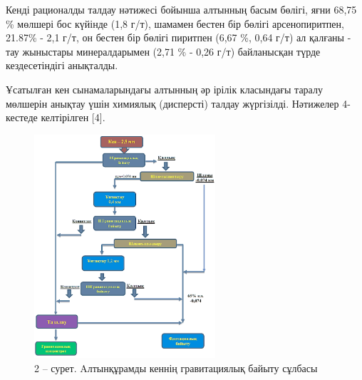 \begin{multicols}{2}

Кенді рационалды талдау нәтижесі бойынша алтынның басым бөлігі, яғни
68,75 \% мөлшері бос күйінде (1,8 г/т), шамамен бестен бір бөлігі
арсенопиритпен, 21.87\% - 2,1 г/т, он бестен бір бөлігі пиритпен (6,67
\%, 0,64 г/т) ал қалғаны - тау жыныстары минералдарымен (2,71 \% - 0,26
г/т) байланысқан түрде кездесетіндігі анықталды.

Ұсатылған кен сынамаларындағы алтынның әр ірілік класындағы таралу
мөлшерін анықтау үшін химиялық (дисперсті) талдау жүргізілді. Нәтижелер
4-кестеде келтірілген {[}4{]}.
\end{multicols}


\begin{figure}[H]
	\centering
	\includegraphics[width=0.6\textwidth]{media/gor/image4}
	\caption*{2 -- сурет. Aлтынқұрамды кеннің гравитациялық байыту сұлбасы}
\end{figure}

